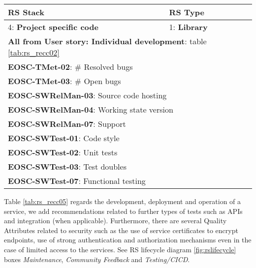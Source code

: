 \begin{center}
  \label{tab:rs_recc04}
  \small
  \begin{tabular}{|p{0.65\linewidth}|p{0.35\linewidth}|} \hline

    \textbf{RS Stack} & \textbf{RS Type} \\ \hline \hline
    4: \textbf{Project specific code} &
    1: \textbf{Library} \\ \hline \hline
    \multicolumn{2}{|l|}{\textbf{All from User story: Individual development}: table \ref{tab:rs_recc02}} \\ \hline
    \multicolumn{2}{|l|}{\textbf{EOSC-TMet-02}: \# Resolved bugs} \\ \hline
    \multicolumn{2}{|l|}{\textbf{EOSC-TMet-03}: \# Open bugs} \\ \hline
    \multicolumn{2}{|l|}{\textbf{EOSC-SWRelMan-03}: Source code hosting} \\ \hline
    \multicolumn{2}{|l|}{\textbf{EOSC-SWRelMan-04}: Working state version} \\ \hline
    \multicolumn{2}{|l|}{\textbf{EOSC-SWRelMan-07}: Support} \\ \hline
    \multicolumn{2}{|l|}{\textbf{EOSC-SWTest-01}: Code style} \\ \hline
    \multicolumn{2}{|l|}{\textbf{EOSC-SWTest-02}: Unit tests} \\ \hline
    \multicolumn{2}{|l|}{\textbf{EOSC-SWTest-03}: Test doubles} \\ \hline
    \multicolumn{2}{|l|}{\textbf{EOSC-SWTest-07}: Functional testing} \\ \hline

  \end{tabular}
\end{center}

Table \ref{tab:rs_recc05} regards the development, deployment and operation of a service, we add recommendations related to further types of tests such as APIs and integration (when applicable). Furthermore, there are several Quality Attributes related to security such as the use of service certificates to encrypt endpoints, use of strong authentication and authorization mechanisms even in the case of limited access to the services. See RS lifecycle diagram \ref{fig:rslifecycle} boxes \textit{Maintenance}, \textit{Community Feedback} and \textit{Testing/CICD}.

